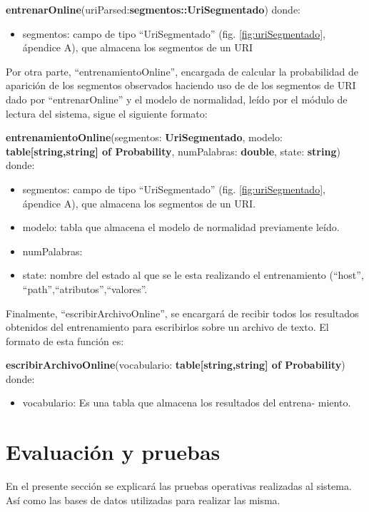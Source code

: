 \textbf{entrenarOnline}(uriParsed:\textbf{segmentos::UriSegmentado})
donde:

\begin{itemize}
\item segmentos: campo de tipo ``UriSegmentado'' (fig. \ref{fig:uriSegmentado}, ápendice A), que almacena
los segmentos de un URI
\end{itemize}

Por otra parte, ``entrenamientoOnline'', encargada de calcular la probabilidad de aparición de los segmentos observados haciendo uso de de los segmentos de URI dado por ``entrenarOnline'' y el modelo de normalidad, leído por el módulo de lectura del sistema, sigue el siguiente formato:

\textbf{entrenamientoOnline}(segmentos: \textbf{UriSegmentado},
modelo: \textbf{table[string,string] of Probability}, numPalabras: \textbf{double}, state: \textbf{string})
donde:
\begin{itemize}
\item segmentos: campo de tipo ``UriSegmentado'' (fig. \ref{fig:uriSegmentado}, ápendice A), que almacena los segmentos de un URI.
\item modelo: tabla que almacena el modelo de normalidad previamente
leído.
\item numPalabras:
\item state: nombre del estado al que se le esta realizando el entrenamiento
(``host'',\\``path'',``atributos'',``valores''.
\end{itemize}

Finalmente, ``escribirArchivoOnline'', se encargará de recibir todos los
resultados obtenidos del entrenamiento para escribirlos sobre un archivo de
texto. El formato de esta función es:

\textbf{escribirArchivoOnline}(vocabulario: \textbf{table[string,string] of Probability})
donde:
\begin{itemize}
\item vocabulario: Es una tabla que almacena los resultados del entrena-
miento.
\end{itemize}


\section{Evaluación y pruebas}

En el presente sección se explicará las pruebas operativas
realizadas al sistema. Así como las bases de datos utilizadas para realizar
las misma.

